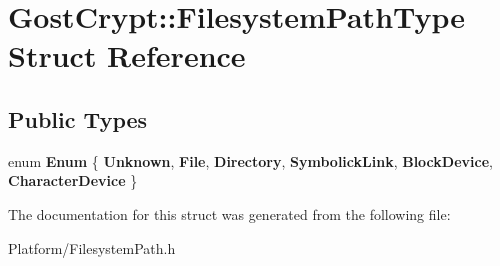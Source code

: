 \hypertarget{struct_gost_crypt_1_1_filesystem_path_type}{}\section{Gost\+Crypt\+:\+:Filesystem\+Path\+Type Struct Reference}
\label{struct_gost_crypt_1_1_filesystem_path_type}
\subsection*{Public Types}
\begin{DoxyCompactItemize}
\item 
\mbox{\label{struct_gost_crypt_1_1_filesystem_path_type_af161427d106d826d4887330c334222d5}} 
enum {\bfseries Enum} \{ \newline
{\bfseries Unknown}, 
{\bfseries File}, 
{\bfseries Directory}, 
{\bfseries Symbolick\+Link}, 
\newline
{\bfseries Block\+Device}, 
{\bfseries Character\+Device}
 \}
\end{DoxyCompactItemize}


The documentation for this struct was generated from the following file\+:\begin{DoxyCompactItemize}
\item 
Platform/Filesystem\+Path.\+h\end{DoxyCompactItemize}
